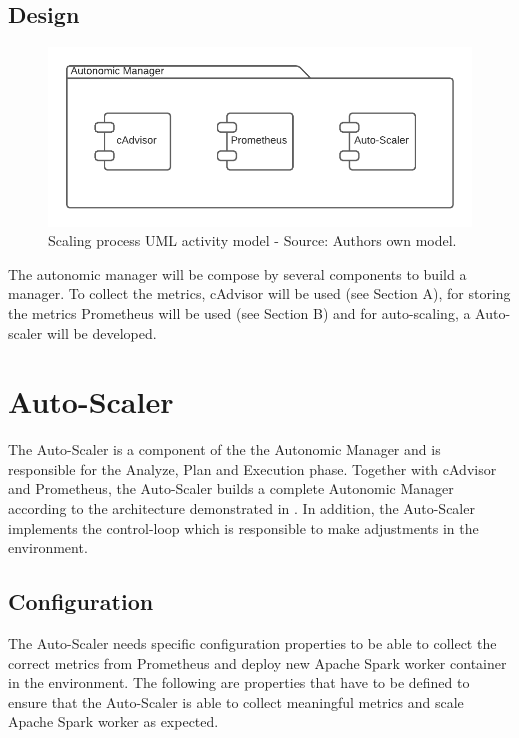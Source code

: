 \subsection{Design}

\begin{figure}[h]%
\centering
\includegraphics[scale=0.6]{images/04_conceptual_design/autonomic_manager/design}%
\caption{Scaling process UML activity model - Source: Authors own model.}%
\label{fig:am-design-component}%
\end{figure}

The autonomic manager will be compose by several components to build a manager. To collect the metrics, cAdvisor will be used (see Section A), for storing the metrics Prometheus will be used (see Section B) and for auto-scaling, a Auto-scaler will be developed.


\section{Auto-Scaler}
The Auto-Scaler is a component of the the Autonomic Manager and is responsible for the Analyze, Plan and Execution phase.
Together with cAdvisor and Prometheus, the Auto-Scaler builds a complete Autonomic Manager according to the architecture demonstrated in .
In addition, the Auto-Scaler implements the control-loop which is responsible to make adjustments in the environment.



\subsection{Configuration}
\label{subsec:design-auto_scaler-configuration}
The Auto-Scaler needs specific configuration properties to be able to collect the correct metrics from Prometheus and deploy new Apache Spark worker container in the environment. The following are properties that have to be defined to ensure that the Auto-Scaler is able to collect meaningful metrics and scale Apache Spark worker as expected.

